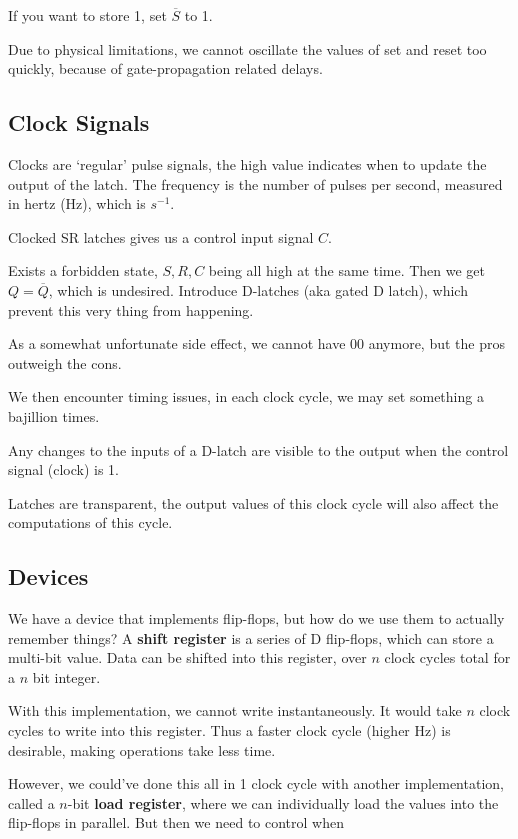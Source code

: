 If you want to store 1, set $\overline{S}$ to 1. 

Due to physical limitations, we cannot oscillate the values of set and reset too quickly, because of gate-propagation related delays.

\subsection{Clock Signals}

Clocks are `regular' pulse signals, the high value indicates when to update the output of the latch. The frequency is the number of pulses per second, measured in hertz (Hz), which is $s^{-1}$.

Clocked SR latches gives us a control input signal $C$.

Exists a forbidden state, $S, R, C$ being all high at the same time. Then we get $Q = \overline{Q}$, which is undesired. Introduce D-latches (aka gated D latch), which prevent this very thing from happening.

As a somewhat unfortunate side effect, we cannot have 00 anymore, but the pros outweigh the cons.

We then encounter timing issues, in each clock cycle, we may set something a bajillion times.

\begin{definition}[Transparent]
    Any changes to the inputs of a D-latch are visible to the output when the control signal (clock) is 1.
\end{definition}

Latches are transparent, the output values of this clock cycle will also affect the computations of this cycle.

\subsection{Devices}

We have a device that implements flip-flops, but how do we use them to actually remember things? A \textbf{shift register} is a series of D flip-flops, which can store a multi-bit value. Data can be shifted into this register, over $n$ clock cycles total for a $n$ bit integer.

With this implementation, we cannot write instantaneously. It would take $n$ clock cycles to write into this register. Thus a faster clock cycle (higher Hz) is desirable, making operations take less time. 

However, we could've done this all in 1 clock cycle with another implementation, called a $n$-bit \textbf{load register}, where we can individually load the values into the flip-flops in parallel. But then we need to control when 
